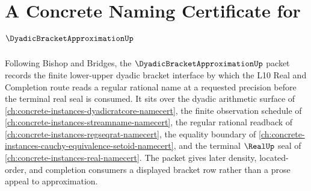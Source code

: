 \chapter{A Concrete Naming Certificate for $\DyadicBracketApproximationUp$}
\label{ch:concrete-instances-dyadic-bracket-approximation-namecert}

Following Bishop and Bridges, the $\DyadicBracketApproximationUp$ packet records the finite lower-upper dyadic bracket interface by which the L10 Real and Completion route reads a regular rational name at a requested precision before the terminal real seal is consumed. It sits over the dyadic arithmetic surface of \autoref{ch:concrete-instances-dyadicratcore-namecert}, the finite observation schedule of \autoref{ch:concrete-instances-streamname-namecert}, the regular rational readback of \autoref{ch:concrete-instances-regseqrat-namecert}, the equality boundary of \autoref{ch:concrete-instances-cauchy-equivalence-setoid-namecert}, and the terminal $\RealUp$ seal of \autoref{ch:concrete-instances-real-namecert}. The packet gives later density, located-order, and completion consumers a displayed bracket row rather than a prose appeal to approximation.

